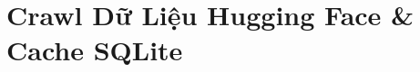 \documentclass[aspectratio=169, xcolor=table]{beamer}
\begin{document}

\section{Crawl Dữ Liệu Hugging Face \& Cache SQLite}
\end{document}
